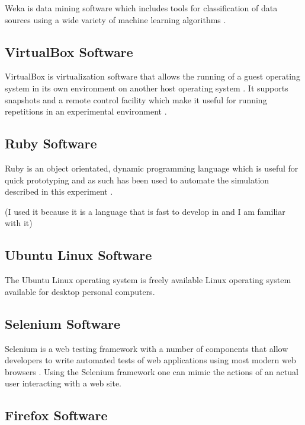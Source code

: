 Weka is data mining software which includes tools for classification of data
sources using a wide variety of machine learning algorithms
\parencite{Hall:2009p7662}.

\subsection{VirtualBox Software}

VirtualBox is virtualization software that allows the running of a guest
operating system in its own environment on another host operating system
\parencite{:fk}.  It supports snapshots and a remote control facility which
make it useful for running repetitions in an experimental environment
\parencite{:uq}.

\subsection{Ruby Software}

Ruby is an object orientated, dynamic programming language which is useful for
quick prototyping and as such has been used to automate the simulation
described in this experiment \parencite{:2010uq}.

(I used it because it is a language that is fast to develop in and I am
familiar with it)

\subsection{Ubuntu Linux Software}

The Ubuntu Linux operating system is freely available Linux operating system
available for desktop personal computers.

\cite{:2010ly}

\subsection{Selenium Software}

Selenium is a web testing framework with a number of components that allow
developers to write automated tests of web applications using most modern web
browsers \parencite{:2010ys}. Using the Selenium framework one can mimic the
actions of an actual user interacting with a web site.

\subsection{Firefox Software}

